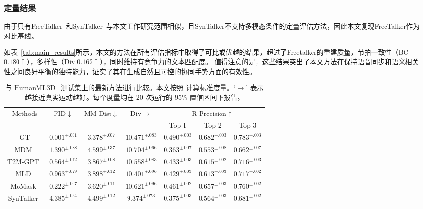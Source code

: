 \subsubsection{定量结果}
由于只有FreeTalker~\cite{yang2024freetalker}和SynTalker~\cite{chen2024syntalker}与本文工作研究范围相似，且SynTalker不支持多模态条件的定量评估方法，因此本文复现FreeTalker作为对比基线。

如表~\ref{tab:main_results}所示，本文的方法在所有评估指标中取得了可比或优越的结果，超过了Freetalker的重建质量，节拍一致性（BC $0.180\uparrow$），多样性（Div $0.162\uparrow$），同时维持有竞争力的文本匹配度。
值得注意的是，这些结果突出了本文方法在保持语音同步和语义相关性之间良好平衡的独特能力，证实了其在生成自然且可控的协同手势方面的有效性。



\begin{table*}[t]
  \centering
  \caption{与 HumanML3D~\cite{guo2022humanml3d} 测试集上的最新方法进行比较。本文按照 \cite{chen2023executing} 计算标准度量。`$\rightarrow$' 表示越接近真实运动越好。每个度量均在 20 次运行的 95\% 置信区间下报告。}
  \label{tab:h3d_results}
  \small
  \begin{tabular}{c cccccc}
  \toprule
  \multirow{2}{*}{Methods} & \multirow{2}{*}{FID$\downarrow$} & \multirow{2}{*}{MM-Dist$\downarrow$} & \multirow{2}{*}{Div$\rightarrow$} & \multicolumn{3}{c}{R-Precision$\uparrow$} \\
  \cmidrule(lr){5-7}
  & & & & Top-1 & Top-2 & Top-3 \\
  \midrule
  GT  &  $0.001^{\pm .001}$ & $3.378^{\pm .007}$ & $10.471^{\pm .083}$ &  $0.490^{\pm .003}$ & $0.682^{\pm .003}$ & $0.783^{\pm .003}$ \\
  MDM~\cite{tevet2022mdm} & $1.390^{\pm .088}$ & $4.599^{\pm .037}$ & $10.704^{\pm .066}$ & $0.363^{\pm .007}$ & $0.553^{\pm .008}$ & $0.662^{\pm .007}$ \\
  T2M-GPT~\cite{zhang2023t2mgpt} &  $0.564^{\pm .012}$ & $3.867^{\pm .008}$ & $10.558^{\pm .083}$  & $0.433^{\pm .003}$ & $0.615^{\pm .002}$ & $0.716^{\pm .003}$ \\
  MLD~\cite{chen2023executing} & $0.963^{\pm .029}$ & $3.898^{\pm .012}$ & $10.401^{\pm .096}$ & $0.429^{\pm .003}$ & $0.613^{\pm .003}$ & $0.717^{\pm .002}$ \\
  MoMask~\cite{guo2024momask} & $0.222^{\pm .007}$ & $3.620^{\pm .011}$ & $10.621^{\pm .096}$ & $0.461^{\pm .002}$ & $0.657^{\pm .003}$ & $0.760^{\pm .002}$ \\
  SynTalker~\cite{chen2024syntalker} & $4.385^{\pm .034}$ & $4.499^{\pm .012}$ & $9.374^{\pm .073}$ & $0.375^{\pm .003}$ & $0.564^{\pm .003}$ & $0.681^{\pm .002}$ \\

\end{tabular}
\end{table*}
